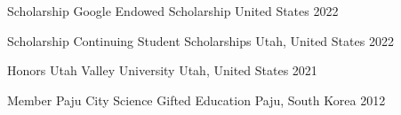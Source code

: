 



\begin{cvhonors}

  \cvhonor
    {Scholarship} %
    {Google Endowed Scholarship} %
    {United States} %
    {2022} %

  \cvhonor
    {Scholarship} %
    {Continuing Student Scholarships} %
    {Utah, United States} %
    {2022} %

  \cvhonor
    {Honors} %
    {Utah Valley University} %
    {Utah, United States} %
    {2021} %

  \cvhonor
    {Member} %
    {Paju City Science Gifted Education} %
    {Paju, South Korea} %
    {2012} %

\end{cvhonors}




